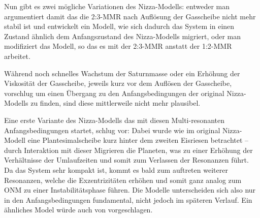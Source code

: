 \documentclass[12pt,a4paper,twoside]{article}
\renewcommand{\cite}{\citep}
\begin{document}
Nun gibt es zwei mögliche Variationen des Nizza-Modells: entweder man argumentiert damit das die 2:3-MMR nach Auflösung der Gasscheibe nicht mehr stabil ist und entwickelt ein Modell, wie sich dadurch das System in einen Zustand ähnlich dem Anfangszustand des Nizza-Modells migriert, oder man modifiziert das Modell, so das es mit der 2:3-MMR anstatt der 1:2-MMR arbeitet.

Während \cite{Morbidelli2007a} noch schnelles Wachstum der Saturnmasse oder ein Erhöhung der Viskosität der Gasscheibe, jeweils kurz vor dem Auflösen der Gasscheibe, vorschlug um einen Übergang zu den Anfangsbedingungen der original Nizza-Modells zu finden, sind diese mittlerweile nicht mehr plausibel\cite{Pierens2008,Zhang2010,Levison2011}. 

Eine erste Variante des Nizza-Modells das mit diesen Multi-resonanten Anfangsbedingungen startet, schlug \cite{Morbidelli2007b} vor:
Dabei wurde wie im original Nizza-Modell eine Plantesimalscheibe kurz hinter dem zweiten Eisriesen betrachtet -- durch Interaktion mit dieser Migrieren die Planeten, was zu einer Erhöhung der Verhältnisse der Umlaufzeiten und somit zum Verlassen der Resonanzen führt.
Da das System sehr kompakt ist, kommt es bald zum auftreten weiterer Resonanzen, welche die Exzentrizitäten erhöhen und somit ganz analog zum ONM zu einer Instabilitätsphase führen. Die Modelle unterscheiden sich also nur in den Anfangsbedingungen fundamental, nicht jedoch im späteren Verlauf.
Ein ähnliches Model würde auch von \cite{Batygin2010} vorgeschlagen.
\end{document}
